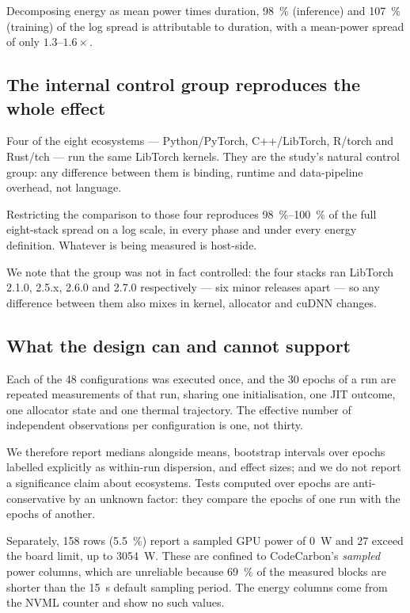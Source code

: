 Decomposing energy as mean power times duration, \SI{98}{\percent} (inference) and
\SI{107}{\percent} (training) of the log spread is attributable to duration, with
a mean-power spread of only \(1.3\)--\(1.6\times\).

\subsection{The internal control group reproduces the whole effect}

Four of the eight ecosystems --- Python/PyTorch, C++/LibTorch, R/torch and
Rust/tch --- run the same LibTorch kernels. They are the study's natural control
group: any difference between them is binding, runtime and data-pipeline
overhead, not language.

Restricting the comparison to those four reproduces
\SIrange{98}{100}{\percent} of the full eight-stack spread on a log scale, in
every phase and under every energy definition. Whatever is being measured is
host-side.

We note that the group was not in fact controlled: the four stacks ran LibTorch
2.1.0, 2.5.x, 2.6.0 and 2.7.0 respectively --- six minor releases apart --- so
any difference between them also mixes in kernel, allocator and cuDNN changes.

\subsection{What the design can and cannot support}

Each of the 48 configurations was executed once, and the 30 epochs of a run are
repeated measurements of that run, sharing one initialisation, one JIT outcome,
one allocator state and one thermal trajectory. The effective number of
independent observations per configuration is one, not thirty.

We therefore report medians alongside means, bootstrap intervals over epochs
labelled explicitly as within-run dispersion, and effect sizes; and we do not
report a significance claim about ecosystems. Tests computed over epochs are
anti-conservative by an unknown factor: they compare the epochs of one run with
the epochs of another.

Separately, \num{158} rows (\SI{5.5}{\percent}) report a sampled GPU power of
\SI{0}{\watt} and \num{27} exceed the board limit, up to \SI{3054}{\watt}. These
are confined to CodeCarbon's \emph{sampled} power columns, which are unreliable
because \SI{69}{\percent} of the measured blocks are shorter than the
\SI{15}{\second} default sampling period. The energy columns come from the NVML
counter and show no such values.
